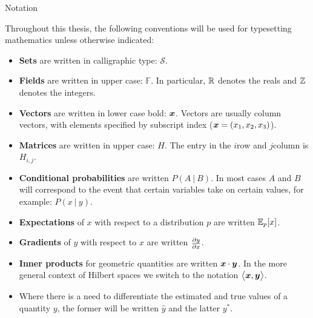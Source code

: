 \vspace*{20mm}
{
\Large\bf
\begin{center}
Notation
\end{center}
}

\label{sec:Notation}
Throughout this thesis, the following conventions will be used for
typesetting mathematics unless otherwise indicated:

\begin{itemize}

\item \textbf{Sets} are written in calligraphic type: $\mathcal{S}$.
\item \textbf{Fields} are written in upper case: $\mathbb{F}$. In
particular, $\Reals$ denotes the reals and $\Ints$ denotes the integers.
\item \textbf{Vectors} are written in lower case bold: $\vect{x}$. Vectors are usually column vectors,
with elements specified by subscript index
(\eg $\vect{x}=(x_1,x_2,x_3)$).
\item \textbf{Matrices} are written in upper case: $H$.
The entry in the $i$\th row and $j$\th column is
$H_{i,j}$.
\item \textbf{Conditional probabilities} are written $P(A ~|~ B)$. In
most cases $A$ and $B$ will correspond to the event that certain
variables take on certain values, for example: $P(x ~|~ y)$.
\item \textbf{Expectations} of $x$ with respect to a distribution $p$
are written $\Expected_p[x]$.
\item \textbf{Gradients} of $y$ with respect to $x$ are written $\Deriv{y}{x}$.
\item \textbf{Inner products} for geometric quantities are written
$\vect{x}\cdot\vect{y}$. In the more general context of Hilbert spaces
we switch to the notation $\bigl\langle\vect{x},\vect{y}\bigr\rangle$.
\item Where there is a need to differentiate the estimated and true
values of a quantity $y$, the former will be written $\hat{y}$ and the
latter $y^*$.

\end{itemize}
